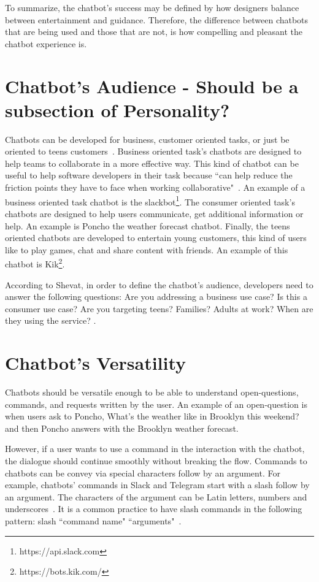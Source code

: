 \documentclass[a4paper,10pt]{article}
\begin{document}
To summarize, the chatbot’s success may be defined by how designers balance between entertainment and guidance. Therefore, the difference between chatbots that are being used and those that are not, is how compelling and pleasant the chatbot experience is.

\section{Chatbot's Audience - Should be a subsection of Personality?}

Chatbots can be developed for business, customer oriented tasks, or just be oriented to teens customers~\cite{Shevat2017}. Business oriented task's chatbots are designed to help teams to collaborate in a more effective way. This kind of chatbot can be useful to help software developers in their task because ``can help reduce the friction points they have to face when working collaborative"~\cite{lebeuf2017software}. An example of a business oriented task chatbot is the slackbot\footnote{https://api.slack.com}. The consumer oriented task's chatbots are designed to help users communicate, get additional information or help. An example is Poncho the weather forecast chatbot. Finally, the teens oriented chatbots are developed to entertain young customers, this kind of users like to play games, chat and share content with friends. An example of this chatbot is Kik\footnote{https://bots.kik.com/}. 

According to Shevat, in order to define the chatbot's audience, developers need to answer the following questions: Are you addressing a business use case? Is this a consumer use case? Are you targeting teens? Families? Adults at work? When are they using the service? \cite{Shevat2017}.

\section{Chatbot's Versatility}
Chatbots should be versatile enough to be able to understand open-questions, commands, and requests written by the user. An example of an open-question is when users ask to Poncho, What's the weather like in Brooklyn this weekend? and then Poncho answers with the Brooklyn weather forecast. 

However, if a user wants to use a command in the interaction with the chatbot, the dialogue should continue smoothly without breaking the flow. Commands to chatbots can be convey via special characters follow by an argument. For example, chatbots' commands in Slack and Telegram start with a slash follow by an argument. The characters of the argument can be Latin letters, numbers and underscores~\cite{botfather}. It is a common practice to have slash commands in the following pattern: slash ``command name" ``arguments"~\cite{Shevat2017}.  
\end{document}
